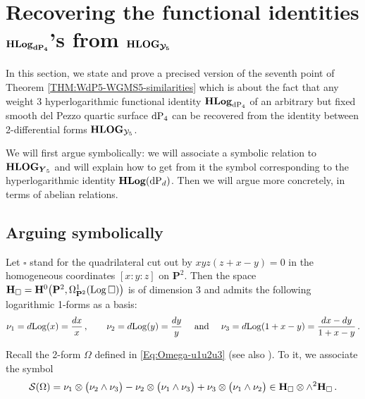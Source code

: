 \documentclass[11pt]{amsart}
\newcommand{\mk}{\medskip}
\begin{document}
\section{\bf Recovering the functional identities $\boldsymbol{{\bf HLog}_{{\rm dP}_4}}$'s 
 from $\boldsymbol{{\bf HLOG}_{{\mathcal Y}_5}}$}
\label{SS:Recovering}
In this section, we state and prove a precised version of the seventh point of Theorem \ref{THM:WdP5-WGMS5-similarities} which is about the fact that any weight 3 hyperlogarithmic functional identity ${\bf HLog}_{{\rm dP}_4}$ 
of an arbitrary but fixed smooth del Pezzo quartic surface ${\rm dP}_4$ 
can be recovered from 
the identity between 2-differential forms ${\bf HLOG}_{{\mathcal Y}_5}$. 
\mk 

We will first argue symbolically: we will associate a symbolic relation to 
${\bf HLOG}_{\boldsymbol{Y}_5}$ 
and will explain how to get from it the symbol corresponding to the hyperlogarithmic identity 
${\bf HLog}({\rm dP}_d)$. Then we will argue more concretely, in terms of abelian relations. 

\subsection{\bf Arguing symbolically}
\label{SS:Arguing-symbolically}
Let $\square$ stand for the quadrilateral cut out by $xyz(z+x-y)=0$ in the homogeneous coordinates $[x:y:z]$ on $\mathbf P^2$. Then the space ${\bf H}_{\square}= {\bf H}^0\big(\mathbf P^2, \Omega^1_{\mathbf P^2}( {\rm Log}\,\square )\big)$ is of dimension 3 and 
admits the following  logarithmic 1-forms as a basis: 
$$
\nu_1=d{\rm Log}(x)=\frac{dx}{x}\, , \qquad 
\nu_2=d{\rm Log}(y)=\frac{dy}{y} \quad
\mbox{ and } \quad  
\nu_3=d{\rm Log}(1+x-y)=\frac{dx-dy}{1+x-y} \, . 
$$



Recall the 2-form $\Omega$ defined in \eqref{Eq:Omega-u1u2u3} (see also \label{Eq:Omega-xy}). To it, we associate the symbol 
$$
\mathcal S(\Omega)= \nu_1\otimes \big( \nu_2\wedge \nu_3
\big) 
- 
\nu_2\otimes \big( \nu_1\wedge \nu_3
\big) 
+
\nu_3\otimes \big( \nu_1\wedge \nu_2
\big)  \in 
{\bf H}_{\square} \otimes \wedge^2 {\bf H}_{\square}\, . 
$$
\end{document}
